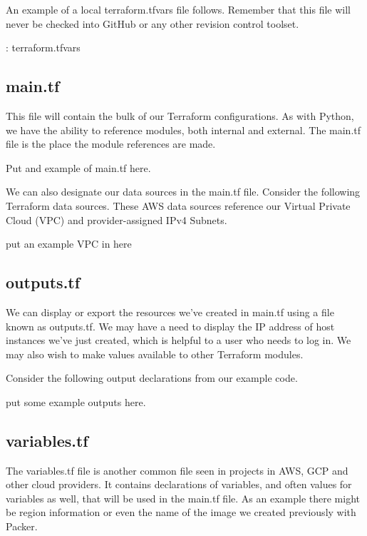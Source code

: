 \justifying
An example of a local terraform.tfvars file follows. Remember that this
file will never be checked into GitHub or any other revision control toolset.

\begin{mybox}{\thetcbcounter: terraform.tfvars}
  
\end{mybox}

\subsection{main.tf}

\justifying
This file will contain the bulk of our Terraform configurations. As with
Python, we have the ability to reference modules, both internal and
external. The main.tf file is the place the module references are made.

Put and example of main.tf here.

\justifying
We can also designate our data sources in the main.tf file. Consider the
following Terraform data sources. These AWS data sources reference our
Virtual Private Cloud (VPC) and provider-assigned IPv4 Subnets.

put an example VPC in here

\subsection{outputs.tf}

\justifying
We can display or export the resources we've created in main.tf using a file known as outputs.tf. We
may have a need to display the IP address of host instances we've just created, which is helpful to
a user who needs to log in. We may also wish to make values available to other Terraform modules.

\justifying
Consider the following output declarations from our example code.

put some example outputs here.

\subsection{variables.tf}

\justifying
The variables.tf file is another common file seen in projects in AWS, GCP and other cloud providers.
It contains declarations of variables, and often values for variables as well, that will be used in the
main.tf file. As an example there might be region information or even the name of the image we created
previously with Packer.

